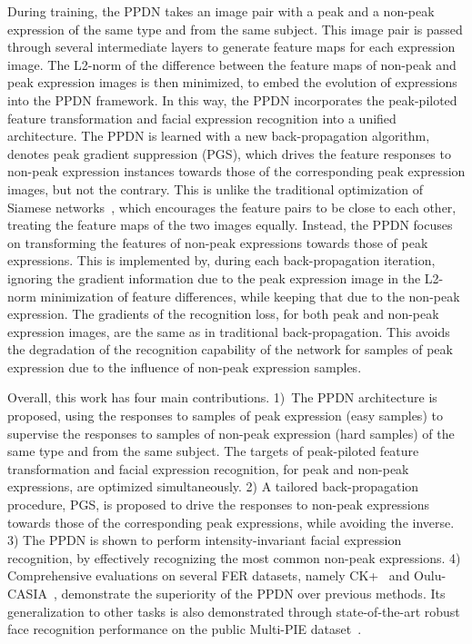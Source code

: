\documentclass[runningheads]{llncs}
\begin{document}
During training, the PPDN takes an image pair with a peak and a non-peak 
expression of the same type and from the same subject. 
This image pair is passed through several intermediate layers to generate 
feature maps for each expression image. The L2-norm of the difference 
between the feature maps of non-peak and peak expression images is then 
minimized, to embed the evolution of expressions into the PPDN framework. 
In this way, the PPDN incorporates the peak-piloted feature transformation 
and facial expression recognition into a unified architecture. The PPDN
is learned with a new back-propagation algorithm, denotes peak gradient 
suppression (PGS), which drives the feature responses to non-peak 
expression instances towards those of the corresponding peak expression 
images, but not the contrary. This is unlike the traditional optimization of
Siamese networks~\cite{chopra2005learning}, which encourages the feature 
pairs to be close to each other, treating the feature maps of the two images 
equally. Instead, the PPDN focuses on transforming the features 
of non-peak expressions towards those of peak expressions. 
This is implemented by, during each back-propagation iteration, 
ignoring the gradient information due to the peak expression image in 
the L2-norm minimization of feature differences, while keeping that
due to the non-peak expression. The gradients of the recognition loss,
for both peak and non-peak expression images, are the same as in traditional 
back-propagation. This avoids the degradation of the recognition 
capability of the network for samples of peak expression due to the
influence of non-peak expression samples.


Overall, this work has four main contributions. 1)~The PPDN architecture 
is proposed, using the responses to samples of peak expression (easy samples) 
to supervise the responses to samples of non-peak expression (hard 
samples) of the same type and from the same subject. The targets of 
peak-piloted feature transformation and facial expression recognition, for 
peak and non-peak expressions, are optimized  simultaneously. 
2) A tailored back-propagation procedure, PGS, is proposed to drive the 
responses to non-peak expressions towards those of the corresponding peak 
expressions, while avoiding the inverse. 3) The PPDN is shown to perform
intensity-invariant facial expression recognition, by effectively 
recognizing the most common non-peak expressions. 4) Comprehensive evaluations 
on several FER datasets, 
namely CK+~\cite{lucey2010extended} and Oulu-CASIA~\cite{zhao2011facial}, 
demonstrate the superiority of the PPDN over previous methods.
Its generalization to other tasks is also demonstrated through
state-of-the-art robust face recognition performance on the public 
Multi-PIE dataset~\cite{gross2010multi}.
\end{document}
